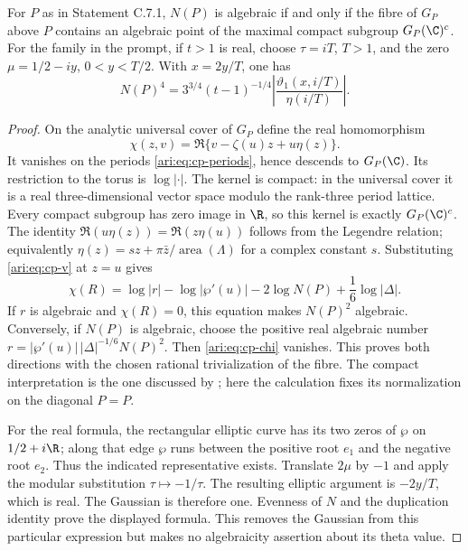 \begin{proposition}\label{ari:C.7.2}
For $P$ as in Statement C.7.1, $N(P)$ is algebraic if and only
if the fibre of $G_P$ above $P$ contains an algebraic point of
the maximal compact subgroup $G_P(\C)^c$.
For the family in the prompt, if $t>1$ is real, choose
$\tau=iT$, $T>1$, and the zero $\mu=1/2-iy$, $0<y<T/2$.
With $x=2y/T$, one has
\[
 N(P)^4=3^{3/4}(t-1)^{-1/4}
       \left|\frac{\vartheta_1(x,i/T)}{\eta(i/T)}\right|.
\]
\end{proposition}
\begin{proof}
On the analytic universal cover of $G_P$ define the real
homomorphism
\[
 \chi(z,v)=\Re\{v-\zeta(u)z+u\eta(z)\}.
\]
It vanishes on the periods \eqref{ari:eq:cp-periods}, hence descends
to $G_P(\C)$. Its restriction to the torus is $\log|\cdot|$.
The kernel is compact: in the universal cover it is a real
three-dimensional vector space modulo the rank-three period
lattice. Every compact subgroup has zero image in $\R$, so
this kernel is exactly $G_P(\C)^c$.
The identity
$\Re(u\eta(z))=\Re(z\eta(u))$ follows from the Legendre relation;
equivalently $\eta(z)=sz+\pi\bar z/\operatorname{area}(\Lambda)$
for a complex constant $s$. Substituting
\eqref{ari:eq:cp-v} at $z=u$ gives
\begin{equation}\label{ari:eq:cp-chi}
 \chi(R)=\log|r|-\log|\wp'(u)|
            -2\log N(P)+\frac16\log|\Delta|.
\end{equation}
If $r$ is algebraic and $\chi(R)=0$, this equation makes
$N(P)^2$ algebraic. Conversely, if $N(P)$ is algebraic,
choose the positive real algebraic number
$r=|\wp'(u)|\,|\Delta|^{-1/6}N(P)^2$.
Then \eqref{ari:eq:cp-chi} vanishes. This proves both directions
with the chosen rational trivialization of the fibre.
The compact interpretation is the one discussed by
\citet[slides 5--8]{bertrand2017}; here the calculation fixes
its normalization on the diagonal $P=P$.

For the real formula, the rectangular elliptic curve has its
two zeros of $\wp$ on $1/2+i\R$; along that edge $\wp$ runs
between the positive root $e_1$ and the negative root $e_2$.
Thus the indicated representative exists. Translate $2\mu$
by $-1$ and apply the modular substitution $\tau\mapsto-1/\tau$.
The resulting elliptic argument is $-2y/T$, which is real.
The Gaussian is therefore one. Evenness of $N$ and the
duplication identity prove the displayed formula. This removes
the Gaussian from this particular expression but makes no
algebraicity assertion about its theta value.
\end{proof}

